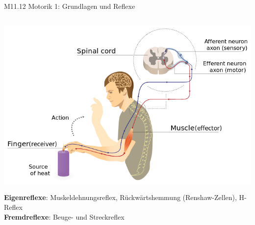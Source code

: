 \documentclass{beamer}
\begin{document}
\begin{frame}{M11.12 Motorik 1: Grundlagen und Reflexe}
\begin{columns}[t]
\begin{column}{6cm}
\begin{center}
    \includegraphics[width=\textwidth]{reflex_arc.png}
\end{center}

\textbf{Eigenreflexe}: Muskeldehnungsreflex, Rückwärtshemmung (Renshaw-Zellen), H-Reflex \\
\textbf{Fremdreflexe}: Beuge- und Streckreflex \\



\end{column}


\end{columns}
$\,$\\[0.2 cm]







\end{frame}
\end{document}
